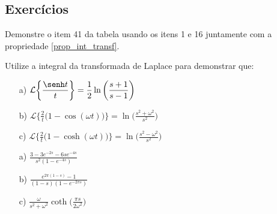 \subsection*{Exercícios}%
\begin{exer}Demonstre o item 41 da tabela usando os itens 1 e 16 juntamente com a propriedade \ref{prop_int_transf}.
\end{exer}
\begin{exer}
Utilize a integral da transformada de Laplace para demonstrar que:
\begin{itemize}
  \item[a)] $\displaystyle \mathcal{L}\bigg\{ \frac{\senh t}{t} \bigg\} = \frac{1}{2} \ln \bigg(\frac{s+1}{s-1}\bigg)$
  \item[b)] $\displaystyle \mathcal{L}\bigg\{ \frac{2}{t} \big( 1 - \cos (\omega t) \big) \bigg\} = \ln \bigg(\frac{s^2 + \omega^2}{s^2}\bigg)$
  \item[c)] $\displaystyle \mathcal{L}\bigg\{ \frac{2}{t} \big( 1 - \cosh (\omega t) \big) \bigg\} = \ln \bigg(\frac{s^2 - \omega^2}{s^2}\bigg)$
\end{itemize}
\end{exer}
\begin{resp}
 \begin{itemize}
  \item[a)] $\displaystyle \frac{ 3 - 3 e^{-2s} - 6s e^{-4s} }{s^2 (1 - e^{-4s})}$
  \item[b)] $\displaystyle \frac{  e^{2\pi(1-s)} -1 }{(1-s) (1 - e^{-2\pi s})}$
  \item[c)] $\displaystyle \frac{\omega}{s^2 + \omega^2} \coth \bigg(\frac{\pi s}{2 \omega^2} \bigg)$
 \end{itemize}
\end{resp}


